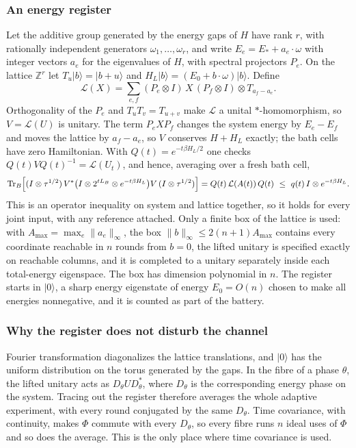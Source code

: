 \subsubsection{An energy register}

Let the additive group generated by the energy gaps of $H$ have rank $r$, with rationally independent generators $\omega_1,\dots,\omega_r$, and write $E_e=E_*+a_e\cdot\omega$ with integer vectors $a_e$ for the eigenvalues of $H$, with spectral projectors $P_e$. On the lattice $\mathbb Z^r$ let $T_u|b\rangle=|b+u\rangle$ and $H_L|b\rangle=(E_0+b\cdot\omega)|b\rangle$. Define
\[
\mathcal L(X)=\sum_{e,f}(P_e\otimes I)\,X\,(P_f\otimes I)\otimes T_{a_f-a_e}.
\]
Orthogonality of the $P_e$ and $T_uT_v=T_{u+v}$ make $\mathcal L$ a unital $*$-homomorphism, so $V=\mathcal L(U)$ is unitary. The term $P_eXP_f$ changes the system energy by $E_e-E_f$ and moves the lattice by $a_f-a_e$, so $V$ conserves $H+H_L$ exactly; the bath cells have zero Hamiltonian. With $Q(t)=e^{-t\beta H_L/2}$ one checks $Q(t)VQ(t)^{-1}=\mathcal L(U_t)$, and hence, averaging over a fresh bath cell,
\begin{equation}\label{sw:eq:effect}
\operatorname{Tr}_B\Bigl[(I\otimes\tau^{1/2})\,V^*\bigl(I\otimes2^{tL_B}\otimes e^{-t\beta H_L}\bigr)V\,(I\otimes\tau^{1/2})\Bigr]=Q(t)\,\mathcal L(A(t))\,Q(t)\ \le\ q(t)\,I\otimes e^{-t\beta H_L}.
\end{equation}
This is an operator inequality on system and lattice together, so it holds for every joint input, with any reference attached. Only a finite box of the lattice is used: with $A_{\max}=\max_e\|a_e\|_\infty$, the box $\|b\|_\infty\le2(n+1)A_{\max}$ contains every coordinate reachable in $n$ rounds from $b=0$, the lifted unitary is specified exactly on reachable columns, and it is completed to a unitary separately inside each total-energy eigenspace. The box has dimension polynomial in $n$. The register starts in $|0\rangle$, a sharp energy eigenstate of energy $E_0=O(n)$ chosen to make all energies nonnegative, and it is counted as part of the battery.

\subsubsection{Why the register does not disturb the channel}

Fourier transformation diagonalizes the lattice translations, and $|0\rangle$ has the uniform distribution on the torus generated by the gaps. In the fibre of a phase $\theta$, the lifted unitary acts as $D_\theta UD_\theta^*$, where $D_\theta$ is the corresponding energy phase on the system. Tracing out the register therefore averages the whole adaptive experiment, with every round conjugated by the same $D_\theta$. Time covariance, with continuity, makes $\Phi$ commute with every $D_\theta$, so every fibre runs $n$ ideal uses of $\Phi$ and so does the average. This is the only place where time covariance is used.

